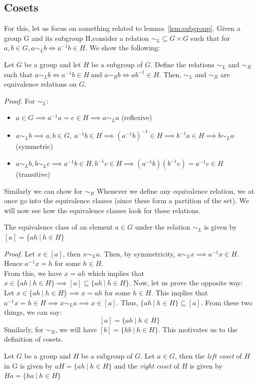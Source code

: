 \subsection{Cosets}
For this, let us focus on something related to lemma~\ref{lem:subgroup}. Given a group G and its subgroup H,consider a relation $\sim_L\subseteq G\times G$ such that for $a,b\in G, a\sim_Lb \iff a^{-1}b\in H$. We show the following:
\begin{proposition}
    Let $G$ be a group and let $H$ be a subgroup of $G$. Define the relations $\sim_L$ and $\sim_R$ such that $a\sim_L b \iff a^{-1}b\in H\ \text{and } a\sim_R b \iff ab^{-1}\in H$. Then, $\sim_L$ and $\sim_R$ are equivalence relations on $G$. 
\end{proposition}
\textit{Proof.} For $\sim_L$:
\begin{itemize}
    \item $a\in G \implies a^{-1}a = e \in H\implies a\sim_L a$ (reflexive)
    \item $a\sim_Lb\implies a,b \in G,\ a^{-1}b \in H \implies (a^{-1}b)^{-1}\in H \implies b^{-1}a\in H \implies  b\sim_La$ (symmetric)
    \item $a\sim_Lb, b\sim_Lc\implies a^{-1}b\in H, b^{-1}c\in H\implies (a^{-1}b)(b^{-1}c)= a^{-1}c\in H$ (transitive)
\end{itemize}
Similarly we can show for $\sim_R$
Whenever we define any equivalence relation, we at once go into the equivalence classes (since these form a partition of the set). We will now see how the equivalence classes look for these relations.
\begin{lemma}
    The equivalence class of an element $a\in G$ under the relation $\sim_L$ is given by $[a] = \{ah\ |\ h\in H\}$
\end{lemma}
\textit{Proof.} Let $x\in [a]$, then $x\sim_L a$. Then, by symmetricity, $a\sim_L x\implies a^{-1}x\in H$. Hence $a^{-1}x = h$ for some $h\in H$. \\[0.3cm]
From this, we have $x = ah$ which implies that $x\in \{ah \ | \ h\in H\} \implies [a]\subseteq \{ah \ | \ h\in H\}$. Now, let us prove the opposite way:\\[0.3cm]
Let $x\in \{ah \ | \ h\in H\} \implies x = ah$ for some $h\in H$. This implies that $a^{-1}x = h \in H \implies x\sim_L a \implies x\in [a]$. Thus,  $\{ah \ | \ h\in H\} \subseteq [a]$. From these two things, we can say:
$$[a] = \{ah\ |\ h\in H\}$$
Similarly, for $\sim_R$, we will have $[b] = \{hb \ |\ h\in H\}$. This motivates us to the definition of cosets.
\begin{definition}[Cosets]
    Let $G$ be a group and $H$ be a subgroup of $G$. Let $a\in G$, then the \textit{left coset} of $H$ in G is given by $aH = \{ah \ | \ h\in H\}$ and the \textit{right coset} of $H$ is given by $Ha = \{ha \ | \ h\in H\}$
    
\end{definition}
